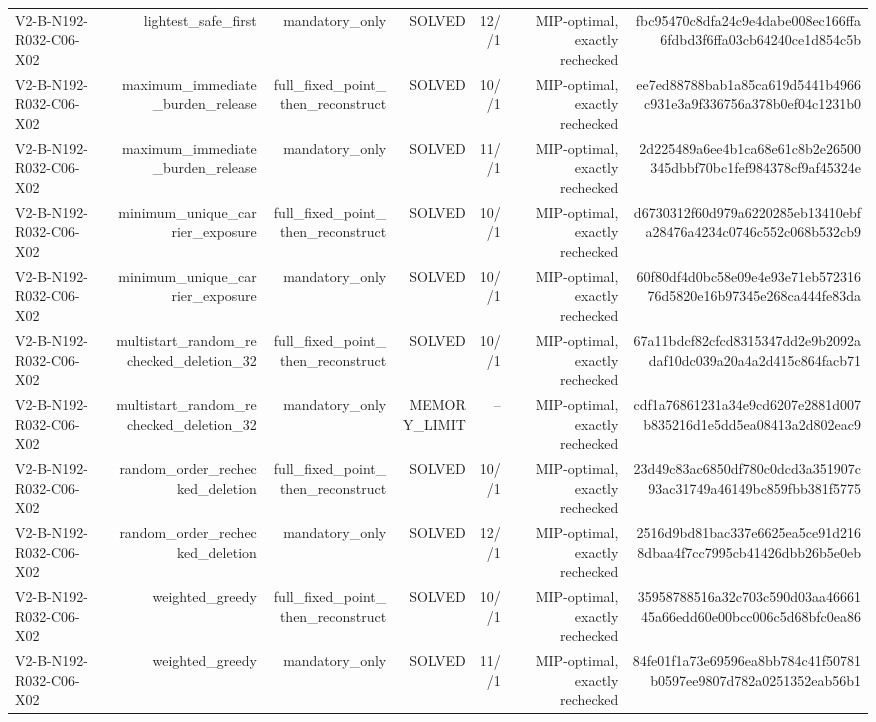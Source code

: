 {\begin{longtable}{lrrrrrr}
V2-B-N192-R032-C06-X02 & lightest\_safe\_first & mandatory\_only & SOLVED & 12//1 & MIP-optimal, exactly rechecked & fbc95470c8dfa24c9e4dabe008ec166ffa6fdbd3f6ffa03cb64240ce1d854c5b \\
V2-B-N192-R032-C06-X02 & maximum\_immediate\_burden\_release & full\_fixed\_point\_then\_reconstruct & SOLVED & 10//1 & MIP-optimal, exactly rechecked & ee7ed88788bab1a85ca619d5441b4966c931e3a9f336756a378b0ef04c1231b0 \\
V2-B-N192-R032-C06-X02 & maximum\_immediate\_burden\_release & mandatory\_only & SOLVED & 11//1 & MIP-optimal, exactly rechecked & 2d225489a6ee4b1ca68e61c8b2e26500345dbbf70bc1fef984378cf9af45324e \\
V2-B-N192-R032-C06-X02 & minimum\_unique\_carrier\_exposure & full\_fixed\_point\_then\_reconstruct & SOLVED & 10//1 & MIP-optimal, exactly rechecked & d6730312f60d979a6220285eb13410ebfa28476a4234c0746c552c068b532cb9 \\
V2-B-N192-R032-C06-X02 & minimum\_unique\_carrier\_exposure & mandatory\_only & SOLVED & 10//1 & MIP-optimal, exactly rechecked & 60f80df4d0bc58e09e4e93e71eb57231676d5820e16b97345e268ca444fe83da \\
V2-B-N192-R032-C06-X02 & multistart\_random\_rechecked\_deletion\_32 & full\_fixed\_point\_then\_reconstruct & SOLVED & 10//1 & MIP-optimal, exactly rechecked & 67a11bdcf82cfcd8315347dd2e9b2092adaf10dc039a20a4a2d415c864facb71 \\
V2-B-N192-R032-C06-X02 & multistart\_random\_rechecked\_deletion\_32 & mandatory\_only & MEMORY\_LIMIT & -- & MIP-optimal, exactly rechecked & cdf1a76861231a34e9cd6207e2881d007b835216d1e5dd5ea08413a2d802eac9 \\
V2-B-N192-R032-C06-X02 & random\_order\_rechecked\_deletion & full\_fixed\_point\_then\_reconstruct & SOLVED & 10//1 & MIP-optimal, exactly rechecked & 23d49c83ac6850df780c0dcd3a351907c93ac31749a46149bc859fbb381f5775 \\
V2-B-N192-R032-C06-X02 & random\_order\_rechecked\_deletion & mandatory\_only & SOLVED & 12//1 & MIP-optimal, exactly rechecked & 2516d9bd81bac337e6625ea5ce91d2168dbaa4f7cc7995cb41426dbb26b5e0eb \\
V2-B-N192-R032-C06-X02 & weighted\_greedy & full\_fixed\_point\_then\_reconstruct & SOLVED & 10//1 & MIP-optimal, exactly rechecked & 35958788516a32c703c590d03aa4666145a66edd60e00bcc006c5d68bfc0ea86 \\
V2-B-N192-R032-C06-X02 & weighted\_greedy & mandatory\_only & SOLVED & 11//1 & MIP-optimal, exactly rechecked & 84fe01f1a73e69596ea8bb784c41f50781b0597ee9807d782a0251352eab56b1 \\

\end{longtable}}
